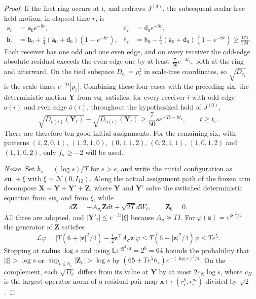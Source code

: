 \begin{proof}
If the first ring occurs at $t_{\mathrm r}$ and redraws $J^{(0)}$, the subsequent scalar-free held motion, in elapsed time $r$, is
\[
\begin{aligned}
\mathsf a_r&=\mathsf a_0e^{-8r},&\mathsf d_r&=\mathsf d_0e^{-8r},\\
\mathsf b_r&=\mathsf b_0+\tfrac14(\mathsf a_0+\mathsf d_0)(1-e^{-8r}),&
\mathsf h_r&=\mathsf h_0-\tfrac14(\mathsf a_0+\mathsf d_0)(1-e^{-8r})\ge\tfrac{171}{224}.
\end{aligned}
\]
Each receiver has one odd and one even edge, and on every receiver the odd-edge absolute residual exceeds the even-edge one by at least $\frac7{50}e^{-4t_{\mathrm r}}$, both at the ring and afterward. On the tied subspace $D_{e_i}=\rho_i^2$ in scale-free coordinates, so $\sqrt{D_{e_i}}$ is the scale times $e^{-Tt}|\rho_i|$. Combining these four cases with the preceding six, the deterministic motion $\mathbf Y$ from $s\mathbf u_\circ$ satisfies, for every receiver $i$ with odd edge $o(i)$ and even edge $\bar o(i)$, throughout the hypothesized hold of $J^{(0)}$,
\begin{equation}
\sqrt{D_{o(i)}(\mathbf Y_t)}-\sqrt{D_{\bar o(i)}(\mathbf Y_t)}\ge\frac7{50}se^{-Tt-8t_{\mathrm r}},\qquad t\ge t_{\mathrm r}.
\label{eq:sel_lock_margin}
\end{equation}
There are therefore ten good initial assignments. For the remaining six, with patterns $(1,2,0,1)$, $(1,2,1,0)$, $(0,1,1,2)$, $(0,2,1,1)$, $(1,0,1,2)$ and $(1,1,0,2)$, only $f_{\mathbf v}\ge-2$ will be used.

\emph{Noise.} Set $h_s=(\log s)/T$ for $s>e$, and write the initial configuration as $s\mathbf u_\circ+\xi$ with $\xi\sim\mathcal N(0,I_{12})$. Along the actual assignment path of the frozen arm decompose $\mathbf X=\mathbf Y+\mathbf Y'+\mathbf Z$, where $\mathbf Y$ and $\mathbf Y'$ solve the switched deterministic equation from $s\mathbf u_\circ$ and from $\xi$, while
\[
d\mathbf Z=-A_{\sigma_t}\mathbf Zdt+\sqrt{2T}dW_t,\qquad\mathbf Z_0=0.
\]
All three are adapted, and $|\mathbf Y'_t|\le e^{-Tt}|\xi|$ because $A_\sigma\succeq TI$. For $\varphi(\mathbf z)=e^{|\mathbf z|^2/4}$ the generator of $\mathbf Z$ satisfies
\[
\mathcal L\varphi=\bigl[T(6+|\mathbf z|^2/4)-\tfrac12\mathbf z^\top A_\sigma\mathbf z\bigr]\varphi\le T(6-|\mathbf z|^2/4)\varphi\le Te^5.
\]
Stopping at radius $\log s$ and using $\mathbb Ee^{|\xi|^2/4}=2^6=64$ bounds the probability that $|\xi|>\log s$ or $\sup_{t\le h_s}|\mathbf Z_t|>\log s$ by $(65+Te^5h_s)e^{-(\log s)^2/4}$. On the complement, each $\sqrt{D_e}$ differs from its value at $\mathbf Y$ by at most $2c_N\log s$, where $c_N$ is the largest operator norm of a residual-pair map $\mathbf x\mapsto(r^b_i,r^m_i)$ divided by $\sqrt2$.


\end{proof}
